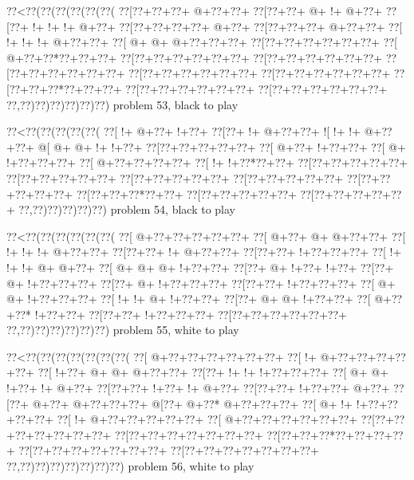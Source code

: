 \vbox{\vbox{\goo
\0??<\0??(\0??(\0??(\0??(\0??(\0??(
\0??[\0??+\0??+\0??+\- @+\0??+\0??+
\0??[\0??+\0??+\- @+\- !+\- @+\0??+
\0??[\0??+\- !+\- !+\- !+\- @+\0??+
\0??[\0??+\0??+\0??+\0??+\- @+\0??+
\0??[\0??+\0??+\0??+\- @+\0??+\0??+
\0??[\- !+\- !+\- !+\- @+\0??+\0??+
\0??[\- @+\- @+\- @+\0??+\0??+\0??+
\0??[\0??+\0??+\0??+\0??+\0??+\0??+
\0??[\- @+\0??+\0??*\0??+\0??+\0??+
\0??[\0??+\0??+\0??+\0??+\0??+\0??+
\0??[\0??+\0??+\0??+\0??+\0??+\0??+
\0??[\0??+\0??+\0??+\0??+\0??+\0??+
\0??[\0??+\0??+\0??+\0??+\0??+\0??+
\0??[\0??+\0??+\0??+\0??+\0??+\0??+
\0??[\0??+\0??+\0??*\0??+\0??+\0??+
\0??[\0??+\0??+\0??+\0??+\0??+\0??+
\0??[\0??+\0??+\0??+\0??+\0??+\0??+
\0??,\0??)\0??)\0??)\0??)\0??)\0??)
}
\hfil problem 53, black to play\hfil\break
}

\vbox{\vbox{\goo
\0??<\0??(\0??(\0??(\0??(\0??(
\0??[\- !+\- @+\0??+\- !+\0??+
\0??[\0??+\- !+\- @+\0??+\0??+
\- ![\- !+\- !+\- @+\0??+\0??+
\- @[\- @+\- @+\- !+\- !+\0??+
\0??[\0??+\0??+\0??+\0??+\0??+
\0??[\- @+\0??+\- !+\0??+\0??+
\0??[\- @+\- !+\0??+\0??+\0??+
\0??[\- @+\0??+\0??+\0??+\0??+
\0??[\- !+\- !+\0??*\0??+\0??+
\0??[\0??+\0??+\0??+\0??+\0??+
\0??[\0??+\0??+\0??+\0??+\0??+
\0??[\0??+\0??+\0??+\0??+\0??+
\0??[\0??+\0??+\0??+\0??+\0??+
\0??[\0??+\0??+\0??+\0??+\0??+
\0??[\0??+\0??+\0??*\0??+\0??+
\0??[\0??+\0??+\0??+\0??+\0??+
\0??[\0??+\0??+\0??+\0??+\0??+
\0??,\0??)\0??)\0??)\0??)\0??)
}
\hfil problem 54, black to play\hfil\break
}

\vbox{\vbox{\goo
\0??<\0??(\0??(\0??(\0??(\0??(\0??(
\0??[\- @+\0??+\0??+\0??+\0??+\0??+
\0??[\- @+\0??+\- @+\- @+\0??+\0??+
\0??[\- !+\- !+\- !+\- @+\0??+\0??+
\0??[\0??+\0??+\- !+\- @+\0??+\0??+
\0??[\0??+\0??+\- !+\0??+\0??+\0??+
\0??[\- !+\- !+\- !+\- @+\- @+\0??+
\0??[\- @+\- @+\- @+\- !+\0??+\0??+
\0??[\0??+\- @+\- !+\0??+\- !+\0??+
\0??[\0??+\- @+\- !+\0??+\0??+\0??+
\0??[\0??+\- @+\- !+\0??+\0??+\0??+
\0??[\0??+\0??+\- !+\0??+\0??+\0??+
\0??[\- @+\- @+\- !+\0??+\0??+\0??+
\0??[\- !+\- !+\- @+\- !+\0??+\0??+
\0??[\0??+\- @+\- @+\- !+\0??+\0??+
\0??[\- @+\0??+\0??*\- !+\0??+\0??+
\0??[\0??+\0??+\- !+\0??+\0??+\0??+
\0??[\0??+\0??+\0??+\0??+\0??+\0??+
\0??,\0??)\0??)\0??)\0??)\0??)\0??)
}
\hfil problem 55, white to play\hfil\break
}

\vbox{\vbox{\goo
\0??<\0??(\0??(\0??(\0??(\0??(\0??(\0??(
\0??[\- @+\0??+\0??+\0??+\0??+\0??+\0??+
\0??[\- !+\- @+\0??+\0??+\0??+\0??+\0??+
\0??[\- !+\0??+\- @+\- @+\- @+\0??+\0??+
\0??[\0??+\- !+\- !+\- !+\0??+\0??+\0??+
\0??[\- @+\- @+\- !+\0??+\- !+\- @+\0??+
\0??[\0??+\0??+\- !+\0??+\- !+\- @+\0??+
\0??[\0??+\0??+\- !+\0??+\0??+\- @+\0??+
\0??[\0??+\- @+\0??+\- @+\0??+\0??+\0??+
\- @[\0??+\- @+\0??*\- @+\0??+\0??+\0??+
\0??[\- @+\- !+\- !+\0??+\0??+\0??+\0??+
\0??[\- !+\- @+\0??+\0??+\0??+\0??+\0??+
\0??[\- @+\0??+\0??+\0??+\0??+\0??+\0??+
\0??[\0??+\0??+\0??+\0??+\0??+\0??+\0??+
\0??[\0??+\0??+\0??+\0??+\0??+\0??+\0??+
\0??[\0??+\0??+\0??*\0??+\0??+\0??+\0??+
\0??[\0??+\0??+\0??+\0??+\0??+\0??+\0??+
\0??[\0??+\0??+\0??+\0??+\0??+\0??+\0??+
\0??,\0??)\0??)\0??)\0??)\0??)\0??)\0??)
}
\hfil problem 56, white to play\hfil\break
}

